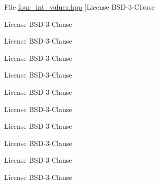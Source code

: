\begin{DoxyRefList}
\hypertarget{license__license000019}{}%
File \hyperlink{four__int__values_8hpp}{four\+\_\+int\+\_\+values.hpp} ]License B\+S\+D-\/3-\/\+Clause  
\item[\label{license__license000015}%
\hypertarget{license__license000015}{}%
File \hyperlink{get__data_8cpp}{get\+\_\+data.cpp} ]License B\+S\+D-\/3-\/\+Clause  
\item[\label{license__license000002}%
\hypertarget{license__license000002}{}%
File \hyperlink{main_8cpp}{main.cpp} ]License B\+S\+D-\/3-\/\+Clause  
\item[\label{license__license000025}%
\hypertarget{license__license000025}{}%
File \hyperlink{serializable__exchange_8hpp}{serializable\+\_\+exchange.hpp} ]License B\+S\+D-\/3-\/\+Clause  
\item[\label{license__license000026}%
\hypertarget{license__license000026}{}%
File \hyperlink{serializable__exchange_8hxx}{serializable\+\_\+exchange.hxx} ]License B\+S\+D-\/3-\/\+Clause 

License B\+S\+D-\/3-\/\+Clause  
\item[\label{license__license000009}%
\hypertarget{license__license000009}{}%
File \hyperlink{set__data_8cpp}{set\+\_\+data.cpp} ]License B\+S\+D-\/3-\/\+Clause 

License B\+S\+D-\/3-\/\+Clause 

License B\+S\+D-\/3-\/\+Clause  
\item[\label{license__license000031}%
\hypertarget{license__license000031}{}%
File \hyperlink{shared__memory_8cpp}{shared\+\_\+memory.cpp} ]License B\+S\+D-\/3-\/\+Clause  
\item[\label{license__license000024}%
\hypertarget{license__license000024}{}%
File \hyperlink{shared__memory_8hpp}{shared\+\_\+memory.hpp} ]License B\+S\+D-\/3-\/\+Clause 


\end{DoxyRefList}
